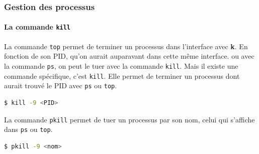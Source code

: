 \documentclass{beamer}
\begin{document}
    \begin{frame}[fragile]
        \transdissolve
        \frametitle{Gestion des processus}
        \framesubtitle{La commande \lstinline{kill}}
        La commande \lstinline{top} permet de terminer un processus dans l'interface avec \textbf{k}.
        En fonction de son PID, qu'on aurait auparavant dans cette même interface.
        ou avec la commande \lstinline{ps}, on peut le tuer avec la commande \lstinline{kill}.
        \bigbreak
        Mais il existe une commande spécifique, c'est \lstinline{kill}.
        Elle permet de terminer un processus dont aurait trouvé le PID avec \lstinline{ps} ou \lstinline{top}.
        \begin{lstlisting}[language=bash]
$ kill -9 <PID>
        \end{lstlisting}
        \bigbreak
        La commande \lstinline{pkill} permet de tuer un processus par son nom, celui qui s'affiche dans \lstinline{ps} ou \lstinline{top}.
        \begin{lstlisting}[language=bash]
$ pkill -9 <nom>
        \end{lstlisting}
    \end{frame}
\end{document}
